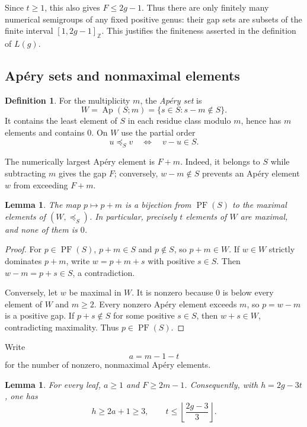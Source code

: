 \documentclass[11pt,letterpaper]{article}
\numberwithin{equation}{section}
\newtheorem{lemma}[theorem]{Lemma}
\theoremstyle{definition}
\newtheorem{definition}[theorem]{Definition}
\theoremstyle{remark}
\newcommand{\Z}{\mathbb Z}
\newcommand{\ints}[2]{[#1,#2]_{\Z}}
\DeclareMathOperator{\PF}{PF}
\DeclareMathOperator{\Ap}{Ap}
\begin{document}
Since $t\ge1$, this also gives $F\le2g-1$. Thus there are only finitely many
numerical semigroups of any fixed positive genus: their gap sets are subsets
of the finite interval $\ints{1}{2g-1}$. This justifies the finiteness asserted
in the definition of $L(g)$.

\subsection{Ap\'ery sets and nonmaximal elements}

\begin{definition}
For the multiplicity $m$, the \emph{Ap\'ery set} is
\[
 W=\Ap(S;m)=\{s\in S:s-m\notin S\}.
\]
It contains the least element of $S$ in each residue class modulo $m$, hence
has $m$ elements and contains $0$. On $W$ use the partial order
\[
 u\preceq_S v\quad\Longleftrightarrow\quad v-u\in S.
\]
\end{definition}

The numerically largest Ap\'ery element is $F+m$. Indeed, it belongs to $S$
while subtracting $m$ gives the gap $F$; conversely, $w-m\notin S$ prevents
an Ap\'ery element $w$ from exceeding $F+m$.

\begin{lemma}\label{lem:aperyPF}
The map $p\mapsto p+m$ is a bijection from $\PF(S)$ to the maximal elements
of $(W,\preceq_S)$. In particular, precisely $t$ elements of $W$ are maximal,
and none of them is $0$.
\end{lemma}

\begin{proof}
For $p\in\PF(S)$, $p+m\in S$ and $p\notin S$, so $p+m\in W$.
If $w\in W$ strictly dominates $p+m$, write $w=p+m+s$ with positive
$s\in S$. Then $w-m=p+s\in S$, a contradiction.

Conversely, let $w$ be maximal in $W$. It is nonzero because $0$ is below
every element of $W$ and $m\ge2$. Every nonzero Ap\'ery element exceeds
$m$, so $p=w-m$ is a positive gap. If $p+s\notin S$ for some positive
$s\in S$, then $w+s\in W$, contradicting maximality. Thus $p\in\PF(S)$.
\end{proof}

Write
\begin{equation}\label{eq:a}
 a=m-1-t
\end{equation}
for the number of nonzero, nonmaximal Ap\'ery elements.

\begin{lemma}\label{lem:leafbasic}
For every leaf, $a\ge1$ and $F\ge2m-1$. Consequently, with
$h=2g-3t$, one has
\begin{equation}\label{eq:hlinear}
 h\ge2a+1\ge3,
 \qquad
 t\le\left\lfloor\frac{2g-3}{3}\right\rfloor.
\end{equation}
\end{lemma}
\end{document}
